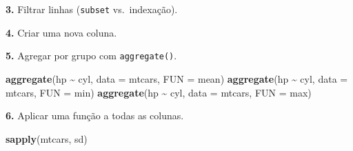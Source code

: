 \documentclass[
  portuguese,
  11pt,
  openany]{book}
\newenvironment{Shaded}{\begin{snugshade}}{\end{snugshade}}
\newcommand{\AttributeTok}[1]{\textcolor[rgb]{0.13,0.29,0.53}{#1}}
\newcommand{\CommentTok}[1]{\textcolor[rgb]{0.56,0.35,0.01}{\textit{#1}}}
\newcommand{\DecValTok}[1]{\textcolor[rgb]{0.00,0.00,0.81}{#1}}
\newcommand{\FloatTok}[1]{\textcolor[rgb]{0.00,0.00,0.81}{#1}}
\newcommand{\FunctionTok}[1]{\textcolor[rgb]{0.13,0.29,0.53}{\textbf{#1}}}
\newcommand{\NormalTok}[1]{#1}
\newcommand{\OtherTok}[1]{\textcolor[rgb]{0.56,0.35,0.01}{#1}}
\newcommand{\SpecialCharTok}[1]{\textcolor[rgb]{0.81,0.36,0.00}{\textbf{#1}}}
\begin{document}
\textbf{3.} Filtrar linhas (\texttt{subset} vs.~indexação).

\begin{Shaded}
\end{Shaded}

\textbf{4.} Criar uma nova coluna.

\begin{Shaded}
\end{Shaded}

\textbf{5.} Agregar por grupo com \texttt{aggregate()}.

\begin{Shaded}
\begin{Highlighting}[]
\FunctionTok{aggregate}\NormalTok{(hp }\SpecialCharTok{\textasciitilde{}}\NormalTok{ cyl, }\AttributeTok{data =}\NormalTok{ mtcars, }\AttributeTok{FUN =}\NormalTok{ mean)}
\FunctionTok{aggregate}\NormalTok{(hp }\SpecialCharTok{\textasciitilde{}}\NormalTok{ cyl, }\AttributeTok{data =}\NormalTok{ mtcars, }\AttributeTok{FUN =}\NormalTok{ min)}
\FunctionTok{aggregate}\NormalTok{(hp }\SpecialCharTok{\textasciitilde{}}\NormalTok{ cyl, }\AttributeTok{data =}\NormalTok{ mtcars, }\AttributeTok{FUN =}\NormalTok{ max)}
\end{Highlighting}
\end{Shaded}

\textbf{6.} Aplicar uma função a todas as colunas.

\begin{Shaded}
\begin{Highlighting}[]
\FunctionTok{sapply}\NormalTok{(mtcars, sd)}
\end{Highlighting}
\end{Shaded}
\end{document}
